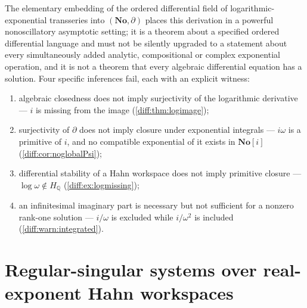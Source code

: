 \documentclass[11pt,letterpaper]{article}
\numberwithin{equation}{section}
\theoremstyle{definition}
\theoremstyle{remark}
\newcommand{\No}{\mathbf{No}}
\newcommand{\SC}{\mathbf{No}[i]}
\newcommand{\Q}{\mathbb Q}
\newcommand{\der}{\partial}
\begin{document}
\begin{remark}
\label{diff:rem:fourinferences}
The elementary embedding of the ordered differential field of
logarithmic-exponential transseries into $(\No,\der)$ \cite{ADH} places this
derivation in a powerful nonoscillatory asymptotic setting; it is a theorem
about a specified ordered differential language and must not be silently
upgraded to a statement about every simultaneously added analytic,
compositional or complex exponential operation, and it is not a theorem that
every algebraic differential equation has a solution. Four specific inferences
fail, each with an explicit witness:
\begin{enumerate}[label=(\arabic*),leftmargin=2.4em]
\item algebraic closedness does not imply surjectivity of the logarithmic
derivative --- $i$ is missing from the image (\cref{diff:thm:logimage});
\item surjectivity of $\der$ does not imply closure under exponential
integrals --- $i\omega$ is a primitive of $i$, and no compatible exponential
of it exists in $\SC$ (\cref{diff:cor:noglobalPsi});
\item differential stability of a Hahn workspace does not imply primitive
closure --- $\log\omega\notin H_{\Q}$ (\cref{diff:ex:logmissing});
\item an infinitesimal imaginary part is necessary but not sufficient for a
nonzero rank-one solution --- $i/\omega$ is excluded while $i/\omega^{2}$ is
included (\cref{diff:warn:integrated}).
\end{enumerate}
\end{remark}
\part{Regular-singular systems over real-exponent Hahn workspaces}
\label{diff:rs:part}
\end{document}
